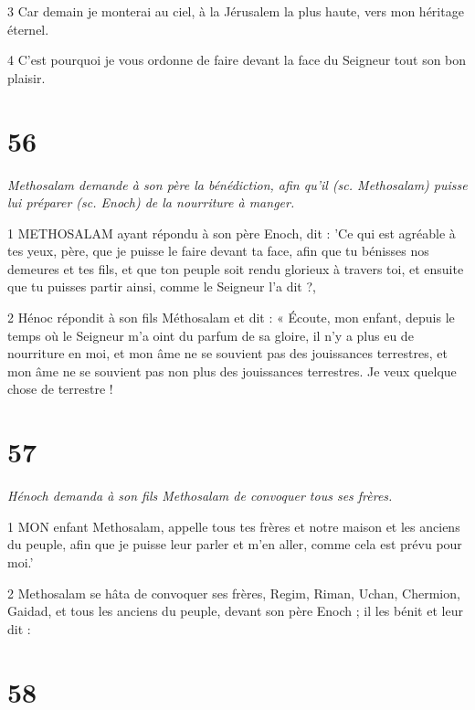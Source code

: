 \par 3 Car demain je monterai au ciel, à la Jérusalem la plus haute, vers mon héritage éternel.

\par 4 C'est pourquoi je vous ordonne de faire devant la face du Seigneur tout son bon plaisir.

\chapter{56}

\par \textit{Methosalam demande à son père la bénédiction, afin qu'il (sc. Methosalam) puisse lui préparer (sc. Enoch) de la nourriture à manger.}

\par 1 METHOSALAM ayant répondu à son père Enoch, dit : 'Ce qui est agréable à tes yeux, père, que je puisse le faire devant ta face, afin que tu bénisses nos demeures et tes fils, et que ton peuple soit rendu glorieux à travers toi, et ensuite que tu puisses partir ainsi, comme le Seigneur l'a dit ?,

\par 2 Hénoc répondit à son fils Méthosalam et dit : « Écoute, mon enfant, depuis le temps où le Seigneur m'a oint du parfum de sa gloire, il n'y a plus eu de nourriture en moi, et mon âme ne se souvient pas des jouissances terrestres, et mon âme ne se souvient pas non plus des jouissances terrestres. Je veux quelque chose de terrestre !

\chapter{57}

\par \textit{Hénoch demanda à son fils Methosalam de convoquer tous ses frères.}

\par 1 MON enfant Methosalam, appelle tous tes frères et notre maison et les anciens du peuple, afin que je puisse leur parler et m'en aller, comme cela est prévu pour moi.'

\par 2 Methosalam se hâta de convoquer ses frères, Regim, Riman, Uchan, Chermion, Gaidad, et tous les anciens du peuple, devant son père Enoch ; il les bénit et leur dit :

\chapter{58}

